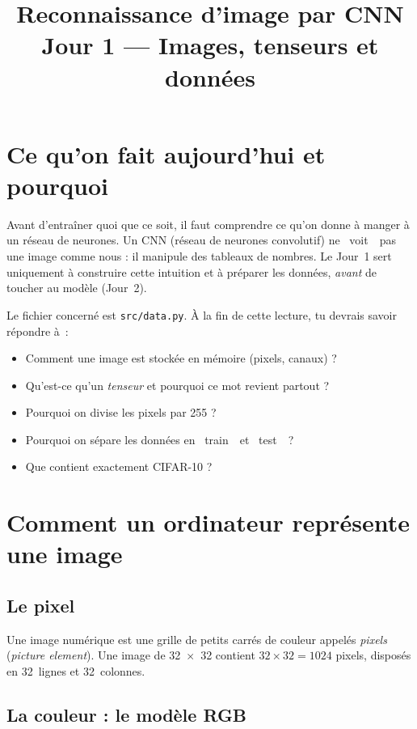 \documentclass[11pt,a4paper]{article}
\title{\Large Reconnaissance d'image par CNN\\[0.3em]\normalsize Jour 1 --- Images, tenseurs et donn\'ees}
\author{}
\date{}
\begin{document}
\maketitle
\vspace{-2em}
\tableofcontents

\section{Ce qu'on fait aujourd'hui et pourquoi}

Avant d'entra\^iner quoi que ce soit, il faut comprendre ce qu'on donne
\`a manger \`a un r\'eseau de neurones. Un CNN (r\'eseau de neurones
convolutif) ne \guillemotleft~voit~\guillemotright\ pas une image comme nous : il manipule des
tableaux de nombres. Le Jour~1 sert uniquement \`a construire cette
intuition et \`a pr\'eparer les donn\'ees, \emph{avant} de toucher au
mod\`ele (Jour~2).

Le fichier concern\'e est \texttt{src/data.py}. \`A la fin de cette
lecture, tu devrais savoir r\'epondre \`a~:
\begin{itemize}[nosep]
  \item Comment une image est stock\'ee en m\'emoire (pixels, canaux) ?
  \item Qu'est-ce qu'un \emph{tenseur} et pourquoi ce mot revient partout ?
  \item Pourquoi on divise les pixels par 255 ?
  \item Pourquoi on s\'epare les donn\'ees en \guillemotleft~train~\guillemotright\ et \guillemotleft~test~\guillemotright\ ?
  \item Que contient exactement CIFAR-10 ?
\end{itemize}

\section{Comment un ordinateur repr\'esente une image}

\subsection{Le pixel}

Une image num\'erique est une grille de petits carr\'es de couleur
appel\'es \emph{pixels} (\emph{picture element}). Une image de
32~$\times$~32 contient $32 \times 32 = 1024$ pixels, dispos\'es en
32~lignes et 32~colonnes.

\subsection{La couleur : le mod\`ele RGB}
\end{document}
